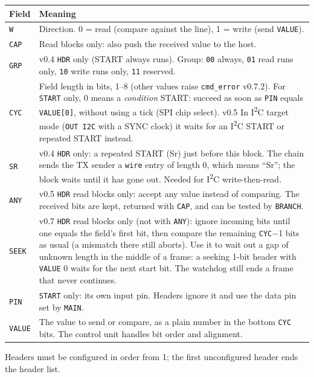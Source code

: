 \documentclass[11pt,a4paper]{article}
\newcommand{\new}{\textcolor{newc}{\textsf{\small v0.4}}}
\newcommand{\vfive}{\textcolor{fivec}{\textsf{\small v0.5}}}
\newcommand{\vseven}{\textcolor{sevenc}{\textsf{\small v0.7}}}
\newcommand{\vseventwo}{\textcolor{sevenc}{\textsf{\small v0.7.2}}}
\newcommand{\sig}[1]{\texttt{#1}}
\begin{document}
\begin{tabularx}{\linewidth}{@{}l>{\raggedright\arraybackslash}X@{}}
\toprule
Field & Meaning \\
\midrule
\sig{W} & Direction. 0 = read (compare against the line), 1 = write (send \sig{VALUE}). \\
\sig{CAP} & Read blocks only: also push the received value to the host. \\
\sig{GRP} & \new{} \sig{HDR} only (START always runs). Group: \texttt{00} always, \texttt{01} read runs only, \texttt{10} write runs only, \texttt{11} reserved. \\
\sig{CYC} & Field length in bits, 1--8 (other values raise \sig{cmd\_error} \vseventwo). For \sig{START} only, 0 means a \emph{condition} START: succeed as soon as \sig{PIN} equals \sig{VALUE[0]}, without using a tick (SPI chip select). \vfive{} In I\textsuperscript{2}C target mode (\sig{OUT I2C} with a SYNC clock) it waits for an I\textsuperscript{2}C START or repeated START instead. \\
\sig{SR} & \new{} \sig{HDR} only: a repeated START (Sr) just before this block. The chain sends the TX sender a \sig{wire} entry of length 0, which means ``Sr''; the block waits until it has gone out. Needed for I\textsuperscript{2}C write-then-read. \\
\sig{ANY} & \vfive{} \sig{HDR} read blocks only: accept any value instead of comparing. The received bits are kept, returned with \sig{CAP}, and can be tested by \sig{BRANCH}. \\
\sig{SEEK} & \vseven{} \sig{HDR} read blocks only (not with \sig{ANY}): ignore incoming bits until one equals the field's first bit, then compare the remaining \sig{CYC}$-$1 bits as usual (a mismatch there still aborts). Use it to wait out a gap of unknown length in the middle of a frame: a seeking 1-bit header with \sig{VALUE} 0 waits for the next start bit. The watchdog still ends a frame that never continues. \\
\sig{PIN} & \sig{START} only: its own input pin. Headers ignore it and use the data pin set by \sig{MAIN}. \\
\sig{VALUE} & The value to send or compare, as a plain number in the bottom \sig{CYC} bits. The control unit handles bit order and alignment. \\
\bottomrule
\end{tabularx}

Headers must be configured in order from 1; the first unconfigured header ends the header list.
\end{document}

